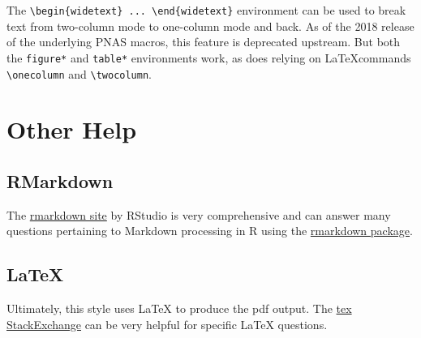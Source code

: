 \documentclass[letterpaper,9pt,twocolumn,twoside,]{pinp}
\begin{document}
The
\texttt{\textbackslash{}begin\{widetext\}\ ...\ \textbackslash{}end\{widetext\}}
environment can be used to break text from two-column mode to one-column
mode and back. As of the 2018 release of the underlying PNAS macros,
this feature is deprecated upstream. But both the \texttt{figure*} and
\texttt{table*} environments work, as does relying on \LaTeX commands
\texttt{\textbackslash{}onecolumn} and
\texttt{\textbackslash{}twocolumn}.

\hypertarget{other-help}{%
\section{Other Help}\label{other-help}}

\hypertarget{rmarkdown}{%
\subsection{RMarkdown}\label{rmarkdown}}

The \href{http://rmarkdown.rstudio.com/}{rmarkdown site} by RStudio is
very comprehensive and can answer many questions pertaining to Markdown
processing in R using the
\href{https://cran.r-project.org/package=rmarkdown}{rmarkdown package}.

\hypertarget{latex}{%
\subsection{LaTeX}\label{latex}}

Ultimately, this style uses LaTeX to produce the pdf output. The
\href{http://tex.stackexchange.com}{tex StackExchange} can be very
helpful for specific LaTeX questions.

\showacknow
\end{document}
